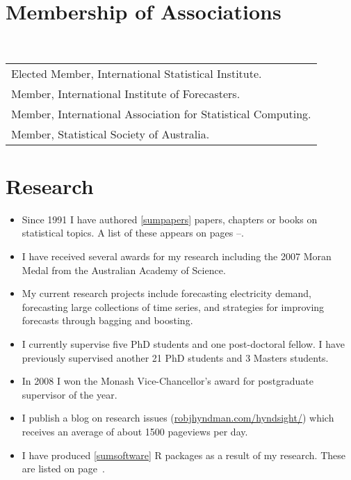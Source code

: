 \documentclass[a4paper,10pt]{article}
\begin{document}
\section{Membership of Associations}

~\begin{tabular}{@{~$\bullet$~~}l}
Elected Member, International Statistical Institute.\\
Member, International Institute of Forecasters.\\
Member, International Association for Statistical Computing.\\
Member, Statistical Society of Australia.
\end{tabular}

\section{Research}

\begin{itemize}\parskip=0cm
\item Since 1991 I have authored \ref{sumpapers} papers, chapters or books on statistical topics. A list of these appears on pages \pageref{papersstart}--\pageref{papersend}.
\item I have received several awards for my research including the 2007 Moran Medal from the Australian Academy of Science.
\item  My current research projects include forecasting electricity demand, forecasting large collections of time series, and strategies for improving forecasts through bagging and boosting.
\item I currently supervise five PhD students and one post-doctoral fellow. I have previously supervised another 21 PhD students and 3 Masters students.
\item In 2008 I won the Monash Vice-Chancellor's award for postgraduate supervisor of the year.
\item I publish a blog on research issues (\url{robjhyndman.com/hyndsight/}) which receives an average of about 1500 pageviews per day.
\item I have produced \ref{sumsoftware} R packages as a result of my research. These are listed on page~\pageref{sumsoftware}.
\end{itemize}
\end{document}
